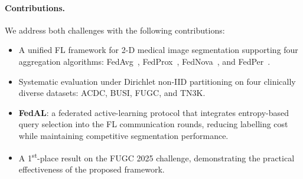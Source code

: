\paragraph{Contributions.}
We address both challenges with the following contributions:
\begin{itemize}
  \item A unified FL framework for 2-D medical image segmentation
    supporting four aggregation algorithms: FedAvg~\cite{mcmahan2017fedavg},
    FedProx~\cite{li2020fedprox}, FedNova~\cite{wang2020fednova}, and
    FedPer~\cite{arivazhagan2019fedper}.
  \item Systematic evaluation under Dirichlet non-IID partitioning on four
    clinically diverse datasets: ACDC, BUSI, FUGC, and TN3K.
  \item \textbf{FedAL}: a federated active-learning protocol that integrates
    entropy-based query selection into the FL communication rounds, reducing
    labelling cost while maintaining competitive segmentation performance.
  \item A 1\textsuperscript{st}-place result on the FUGC 2025 challenge,
    demonstrating the practical effectiveness of the proposed framework.
\end{itemize}
